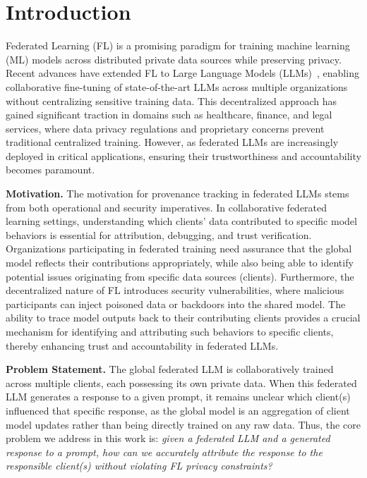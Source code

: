 \section{Introduction}

Federated Learning (FL) is a promising paradigm for training machine learning (ML) models across distributed private data sources while preserving privacy. 
Recent advances have extended FL to Large Language Models (LLMs)~\cite{}, enabling collaborative fine-tuning of state-of-the-art LLMs across multiple organizations without centralizing sensitive training data. 
This decentralized approach has gained significant traction in domains such as healthcare, finance, and legal services, where data privacy regulations and proprietary concerns prevent traditional centralized training. 
However, as federated LLMs are increasingly deployed in critical applications, ensuring their trustworthiness and accountability becomes paramount.


\textbf{Motivation.} The motivation for provenance tracking in federated LLMs stems from both operational and security imperatives. 
In collaborative federated learning settings, understanding which clients' data contributed to specific model behaviors is essential for attribution, debugging, and trust verification. 
Organizations participating in federated training need assurance that the global model reflects their contributions appropriately, while also being able to identify potential issues originating from specific data sources (\ie clients). 
Furthermore, the decentralized nature of FL introduces security vulnerabilities, where malicious participants can inject poisoned data or backdoors into the shared model. 
The ability to trace model outputs back to their contributing clients provides a crucial mechanism for identifying and attributing such behaviors to specific clients, thereby enhancing trust and accountability in federated LLMs.

\textbf{Problem Statement.} 
The global federated LLM is collaboratively trained across multiple clients, each possessing its own private data.
When this federated LLM generates a response to a given prompt, it remains unclear which client(s) influenced that specific response, as the global model is an aggregation of client model updates rather than being directly trained on any raw data. 
Thus, the core problem we address in this work is: \emph{given a federated LLM and a generated response to a prompt, how can we accurately attribute the response to the responsible client(s) without violating FL privacy constraints?}

